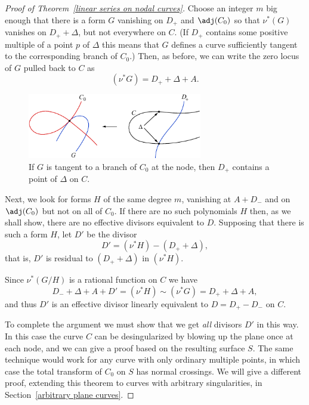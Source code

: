 \begin{proof}[Proof of Theorem~\ref{linear series on nodal curves}]
 Choose an integer $m$
big enough
that there is a form $G$ vanishing
 on  $D_{+}$ and $\adj(C_{0})$ so that
 $\nu^{*}(G)$ vanishes on $D_{+}+\Delta$, but not everywhere on $C$.
 (If $D_{+}$ contains some positive multiple of a point $p$ of $\Delta$
 this means that $G$ defines
 a curve sufficiently tangent to the corresponding branch of $C_0$.)
Then, as before,
we can write the zero locus of $G$ pulled back to $C$ as
$$
(\nu^*G) = D_{+} + \Delta + A.
$$

\begin{figure}
\centerline {\includegraphics[width=3.0in]{"main/Fig14-3"}}
\caption{If $G$ is tangent to a branch of $C_{0}$ at the node, then
$D_{+}$ contains
a point of $\Delta$ on $C$.}
\label{Fig14.2}
\end{figure}

Next, we look for forms $H$ of the same degree $m$, vanishing at $A+D_{-}$
and on $\adj(C_{0})$
 but not on all of $C_0$. If there are no such polynomials $H$ then,
 as we shall show,
there are no effective divisors equivalent to $D$. Supposing that there
is such a form $H$, let $D'$ be the divisor
$$
D' = (\nu^*H) -( D_{+} + \Delta),
$$
that is, $D'$ is residual to $( D_{+} + \Delta)$ in $(\nu^*H)$.

Since $\nu^*(G/H)$ is a rational function on $C$ we have
$$
D_{-} +\Delta + A+ D' = (\nu^*H) \sim (\nu^*G) = D_{+} + \Delta + A,
$$
and thus $D'$ is an effective divisor linearly equivalent to $D =
D_{+}-D_{-}$ on $C$.

To complete the argument we must show that we get \emph{all} divisors $D'$
in this way.
In this case the curve $C$ can be desingularized by blowing up the plane
once at each node,
and we can give a proof based on the resulting surface $S$. The same
technique would work for any curve with only
%
%
%
ordinary multiple points, in which case the total transform of $C_{0}$ on
$S$ has normal crossings. We will give a different proof, extending this
theorem to curves with arbitrary singularities, in Section~\ref{arbitrary
plane curves}.


\end{proof}

